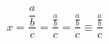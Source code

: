 \documentclass{article}
\begin{document}
\[ x
  = \dfrac{\dfrac{a}{b}}{c}
  = \dfrac{\frac{\textstyle a}{\textstyle b}}{c}
  = \dfrac{\frac{a}{b}}{c}
  \equiv \dfrac{\tfrac{a}{b}}{c}
\]
\end{document}
